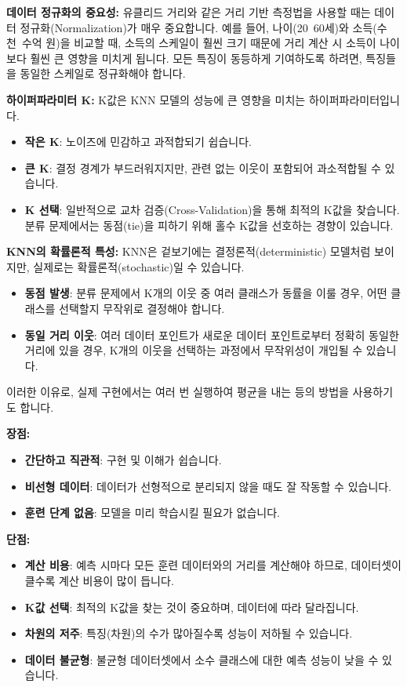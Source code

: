 \documentclass[11pt,a4paper]{article}
\begin{document}
\textbf{데이터 정규화의 중요성:}
유클리드 거리와 같은 거리 기반 측정법을 사용할 때는 데이터 정규화(Normalization)가 매우 중요합니다. 예를 들어, 나이(20~60세)와 소득(수천~수억 원)을 비교할 때, 소득의 스케일이 훨씬 크기 때문에 거리 계산 시 소득이 나이보다 훨씬 큰 영향을 미치게 됩니다. 모든 특징이 동등하게 기여하도록 하려면, 특징들을 동일한 스케일로 정규화해야 합니다.

\textbf{하이퍼파라미터 K:}
K값은 KNN 모델의 성능에 큰 영향을 미치는 하이퍼파라미터입니다.
\begin{itemize}
    \item \textbf{작은 K}: 노이즈에 민감하고 과적합되기 쉽습니다.
    \item \textbf{큰 K}: 결정 경계가 부드러워지지만, 관련 없는 이웃이 포함되어 과소적합될 수 있습니다.
    \item \textbf{K 선택}: 일반적으로 교차 검증(Cross-Validation)을 통해 최적의 K값을 찾습니다. 분류 문제에서는 동점(tie)을 피하기 위해 홀수 K값을 선호하는 경향이 있습니다.
\end{itemize}

\textbf{KNN의 확률론적 특성:}
KNN은 겉보기에는 결정론적(deterministic) 모델처럼 보이지만, 실제로는 확률론적(stochastic)일 수 있습니다.
\begin{itemize}
    \item \textbf{동점 발생}: 분류 문제에서 K개의 이웃 중 여러 클래스가 동률을 이룰 경우, 어떤 클래스를 선택할지 무작위로 결정해야 합니다.
    \item \textbf{동일 거리 이웃}: 여러 데이터 포인트가 새로운 데이터 포인트로부터 정확히 동일한 거리에 있을 경우, K개의 이웃을 선택하는 과정에서 무작위성이 개입될 수 있습니다.
\end{itemize}
이러한 이유로, 실제 구현에서는 여러 번 실행하여 평균을 내는 등의 방법을 사용하기도 합니다.

\textbf{장점:}
\begin{itemize}
    \item \textbf{간단하고 직관적}: 구현 및 이해가 쉽습니다.
    \item \textbf{비선형 데이터}: 데이터가 선형적으로 분리되지 않을 때도 잘 작동할 수 있습니다.
    \item \textbf{훈련 단계 없음}: 모델을 미리 학습시킬 필요가 없습니다.
\end{itemize}

\textbf{단점:}
\begin{itemize}
    \item \textbf{계산 비용}: 예측 시마다 모든 훈련 데이터와의 거리를 계산해야 하므로, 데이터셋이 클수록 계산 비용이 많이 듭니다.
    \item \textbf{K값 선택}: 최적의 K값을 찾는 것이 중요하며, 데이터에 따라 달라집니다.
    \item \textbf{차원의 저주}: 특징(차원)의 수가 많아질수록 성능이 저하될 수 있습니다.
\item \textbf{데이터 불균형}: 불균형 데이터셋에서 소수 클래스에 대한 예측 성능이 낮을 수 있습니다.
\end{itemize}
\end{document}

